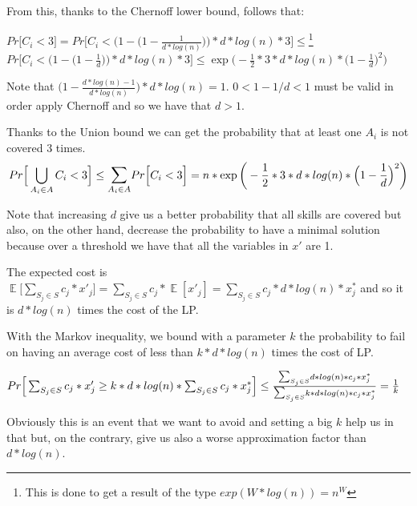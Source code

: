 \documentclass[paper=a4, fontsize=11pt]{scrartcl} %
\numberwithin{equation}{section} %
\numberwithin{figure}{section} %
\numberwithin{table}{section} %
\DeclareMathOperator*{\E}{\mathbb{E}}
\begin{document}
From this, thanks to the Chernoff lower bound, follows that:

\bigskip
$Pr\Big[C_i < 3\Big] = Pr\Big[C_i < \Big(1 - \Big(1 - \frac{1}{d*log(n)}\Big)\Big)*d*log(n)*3\Big] \leq$\footnote{This is done to get a result of the type $exp(W*log(n)) = n^W$} $Pr\Big[C_i < \Big(1 - \Big(1 - \frac{1}{d}\Big)\Big)*d*log(n)*3\Big] \leq \exp\bigg(-\frac{1}{2}*3*d*log(n)*\Big(1 - \frac{1}{d}\Big)^2\bigg)$
\bigskip

Note that $\Big(1 - \frac{d*log(n) -1}{d*log(n)}\Big)*d*log(n) = 1$. $0 < 1 - 1/d < 1$ must be valid in order apply Chernoff and so we have that $d > 1$.




Thanks to the Union bound we can get the probability that at least one $A_i$ is not covered 3 times.
\[
Pr\Big[\bigcup_{A_i \in A} C_i < 3\Big] \leq \mathlarger{\sum}_{A_i \in A} Pr\Big[C_i < 3\Big] = n*\exp\bigg(-\frac{1}{2}*3*d*log(n)*\Big(1 - \frac{1}{d}\Big)^2\bigg)
\]

Note that increasing $d$ give us a better probability that all skills are covered but also, on the other hand, decrease the probability to have a minimal solution because over a threshold we have that all the variables in $x'$ are 1.

The expected cost is $\E\big[\sum_{S_j \in S} c_j*x'_j\big] = \sum_{S_j \in S} c_j*\E[x'_j] = \sum_{S_j \in S} c_j*d*log(n)*x^*_j$ and so it is $d*log(n)$ times the cost of the LP.

With the Markov inequality, we bound with a parameter $k$ the probability to fail on having an average cost of less than $k*d*log(n)$ times the cost of LP.

\bigskip
$Pr\Big[\sum_{S_j \in S} c_j*x'_j \geq k*d*log(n)*\sum_{S_j \in S} c_j*x^*_j\Big] \leq
\frac{\mathlarger{\sum}_{S_j \in S} d*log(n)*c_j*x^*_j}{\mathlarger{\sum}_{S_j \in S} k*d*log(n)*c_j*x^*_j} = \frac{1}{k}$
\bigskip

Obviously this is an event that we want to avoid and setting a big $k$ help us in that but, on the contrary, give us also a worse approximation factor than $d*log(n)$.
\end{document}
